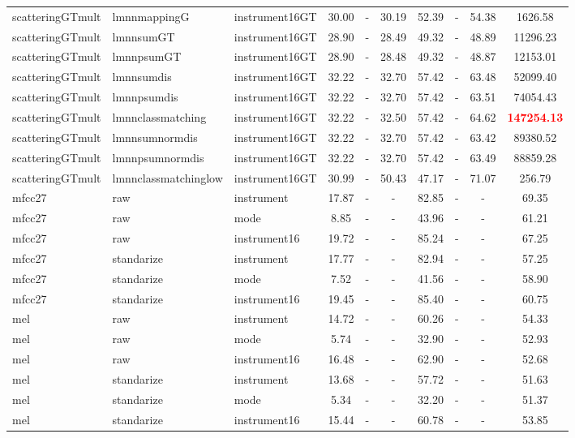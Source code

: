 \begin{tabular}{lllccccccc}
scatteringGTmult & lmnnmappingG & instrument16GT & 30.00 &   - & 30.19 & 52.39 &   - & 54.38 &   1626.58 \\ 
scatteringGTmult & lmnnsumGT & instrument16GT & 28.90 &   - & 28.49 & 49.32 &   - & 48.89 &  11296.23 \\ 
scatteringGTmult & lmnnpsumGT & instrument16GT & 28.90 &   - & 28.48 & 49.32 &   - & 48.87 &  12153.01 \\ 
scatteringGTmult & lmnnsumdis & instrument16GT & 32.22 &   - & 32.70 & 57.42 &   - & 63.48 &  52099.40 \\ 
scatteringGTmult & lmnnpsumdis & instrument16GT & 32.22 &   - & 32.70 & 57.42 &   - & 63.51 &  74054.43 \\ 
scatteringGTmult & lmnnclassmatching & instrument16GT & 32.22 &   - & 32.50 & 57.42 &   - & 64.62 & \textbf{\textcolor{red}{147254.13}} \\ 
scatteringGTmult & lmnnsumnormdis & instrument16GT & 32.22 &   - & 32.70 & 57.42 &   - & 63.42 &  89380.52 \\ 
scatteringGTmult & lmnnpsumnormdis & instrument16GT & 32.22 &   - & 32.70 & 57.42 &   - & 63.49 &  88859.28 \\ 
scatteringGTmult & lmnnclassmatchinglow & instrument16GT & 30.99 &   - & 50.43 & 47.17 &   - & 71.07 &    256.79 \\ 
mfcc27 & raw & instrument & 17.87 &   - &   - & 82.85 &   - &   - &     69.35 \\ 
mfcc27 & raw & mode &  8.85 &   - &   - & 43.96 &   - &   - &     61.21 \\ 
mfcc27 & raw & instrument16 & 19.72 &   - &   - & 85.24 &   - &   - &     67.25 \\ 
mfcc27 & standarize & instrument & 17.77 &   - &   - & 82.94 &   - &   - &     57.25 \\ 
mfcc27 & standarize & mode &  7.52 &   - &   - & 41.56 &   - &   - &     58.90 \\ 
mfcc27 & standarize & instrument16 & 19.45 &   - &   - & 85.40 &   - &   - &     60.75 \\ 
mel & raw & instrument & 14.72 &   - &   - & 60.26 &   - &   - &     54.33 \\ 
mel & raw & mode &  5.74 &   - &   - & 32.90 &   - &   - &     52.93 \\ 
mel & raw & instrument16 & 16.48 &   - &   - & 62.90 &   - &   - &     52.68 \\ 
mel & standarize & instrument & 13.68 &   - &   - & 57.72 &   - &   - &     51.63 \\ 
mel & standarize & mode &  5.34 &   - &   - & 32.20 &   - &   - &     51.37 \\ 
mel & standarize & instrument16 & 15.44 &   - &   - & 60.78 &   - &   - &     53.85 \\ 
\end{tabular} 
